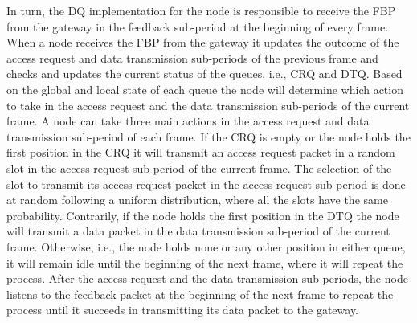 In turn, the DQ implementation for the node is responsible to receive the FBP from the gateway in the feedback sub-period at the beginning of every frame. When a node receives the FBP from the gateway it updates the outcome of the access request and data transmission sub-periods of the previous frame and checks and updates the current status of the queues, i.e., CRQ and DTQ. Based on the global and local state of each queue the node will determine which action to take in the access request and the data transmission sub-periods of the current frame. A node can take three main actions in the access request and data transmission sub-period of each frame. If the CRQ is empty or the node holds the first position in the CRQ it will transmit an access request packet in a random slot in the access request sub-period of the current frame. The selection of the slot to transmit its access request packet in the access request sub-period is done at random following a uniform distribution, where all the slots have the same probability. Contrarily, if the node holds the first position in the DTQ the node will transmit a data packet in the data transmission sub-period of the current frame. Otherwise, i.e., the node holds none or any other position in either queue, it will remain idle until the beginning of the next frame, where it will repeat the process. After the access request and the data transmission sub-periods, the node listens to the feedback packet at the beginning of the next frame to repeat the process until it succeeds in transmitting its data packet to the gateway.

